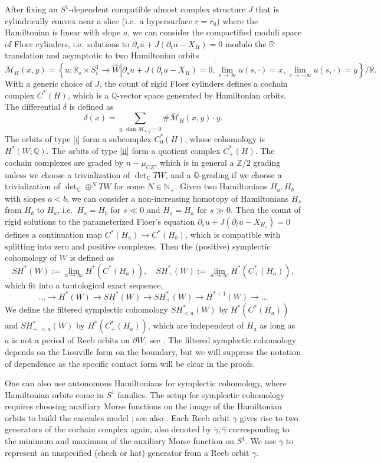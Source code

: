 \documentclass[reqno,11pt]{amsart}
\numberwithin{equation}{section}
\def\N{{\mathbb N}}
\def\R{\mathbb{R}}
\def\Z{{\mathbb Z}}
\def\C{{\mathbb C}}
\def\Q{{\mathbb Q}}
\def\cM{{\mathcal M}}
\begin{document}
After fixing an $S^1$-dependent compatible almost complex structure $J$ that is cylindrically convex near a slice (i.e.\ a hypersurface $r=r_0$) where the Hamiltonian is linear with slope $a$, we can consider the compactified moduli space of Floer cylinders, i.e.\ solutions to $\partial_s u+J(\partial_t u-X_{H})=0$ modulo the $\R$ translation and asymptotic to two Hamiltonian orbits
$$\overline{\cM}_{H}(x,y)=\overline{\left\{u:\R_s\times S^1_t\to \widehat{W}\left|\partial_s u+J(\partial_t u-X_{H})=0, \lim_{s\to \infty} u(s,\cdot)=x, \lim_{s\to -\infty} u(s,\cdot)=y \right.\right\}/\R}.$$
With a generic choice of $J$, the count of rigid Floer cylinders defines a cochain complex $C^*(H)$, which is a $\Q$-vector space generated by Hamiltonian orbits. The differential $\delta$ is defined as
$$\delta(x)=\sum_{y,\dim \cM_{x,y}=0} \# \overline{\cM}_H(x,y)\cdot y.$$
The orbits of type \eqref{i} form a subcomplex $C^*_0(H)$, whose cohomology is $H^*(W;\Q)$. The orbits of type \eqref{ii} form a quotient complex $C^*_+(H)$. The cochain complexes are graded by $n-\mu_{CZ}$, which is in general a $\Z/2$ grading unless we choose a trivialization of $\det_{\C}TW$, and a $\Q$-grading if we choose a trivialization of $\det_{\C}\oplus^N TW$ for some $N\in \N_+$. Given two Hamiltonians $H_a,H_b$ with slopes $a<b$, we can consider a non-increasing homotopy of Hamiltonians $H_s$ from $H_b$ to $H_a$, i.e.\ $H_s=H_b$ for $s\ll0$ and $H_s=H_a$ for $s\gg 0$. Then the count of rigid solutions to the parameterized Floer's equation $\partial_s u+J(\partial_t u-X_{H_s})=0$ defines a continuation map $C^*(H_a)\to C^*(H_b)$, which is compatible with splitting into zero and positive complexes. Then the (positive) symplectic cohomology of $W$ is defined as
$$SH^*(W):=\lim_{a\to \infty} H^*(C^*(H_a)),\quad SH_+^*(W):=\lim_{a\to \infty} H^*(C^*_+(H_a)),$$
which fit into a tautological exact sequence,
$$\ldots \to H^*(W)\to SH^*(W)\to SH^*_+(W)\to H^{*+1}(W)\to \ldots $$
We define the filtered symplectic cohomology $SH^*_{<a}(W)$ by $H^*(C^*(H_a))$ and $SH^*_{+,<a}(W)$ by $H^*(C^*_+(H_a))$, which are independent of $H_a$ as long as $a$ is not a period of Reeb orbits on $\partial W$, see \cite[Proposition 2.8]{zhou2020mathbb}. The filtered symplectic cohomology depends on the Liouville form on the boundary, but we will suppress the notation of dependence as the specific contact form will be clear in the proofs.

One can also use autonomous Hamiltonians for symplectic cohomology, where Hamiltonian orbits come in $S^1$ families. The setup for symplectic cohomology requires choosing auxiliary Morse functions on the image of the Hamiltonian orbits to build the cascades model \cite{MR2475400}; see also \cite[\S 2.2]{zbMATH07673358}. Each Reeb orbit $\gamma$ gives rise to two generators of the cochain complex again, also denoted by $\check{\gamma},\hat{\gamma}$ corresponding to the minimum and maximum of the auxiliary Morse function on $S^1$. We use $\overline{\gamma}$ to represent an unspecified (check or hat) generator from a Reeb orbit $\gamma$.
\end{document}
